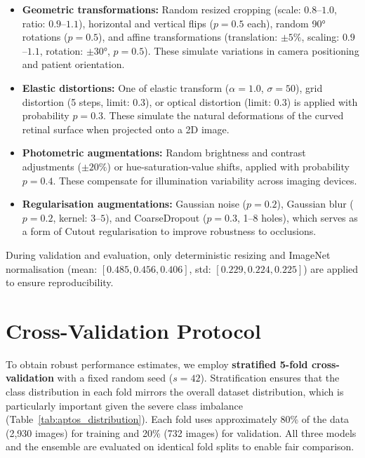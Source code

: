\begin{itemize}
    \item \textbf{Geometric transformations:} Random resized cropping (scale: $0.8$--$1.0$, ratio: $0.9$--$1.1$), horizontal and vertical flips ($p = 0.5$ each), random 90° rotations ($p = 0.5$), and affine transformations (translation: $\pm5\%$, scaling: $0.9$--$1.1$, rotation: $\pm30°$, $p = 0.5$). These simulate variations in camera positioning and patient orientation.
    
    \item \textbf{Elastic distortions:} One of elastic transform ($\alpha = 1.0$, $\sigma = 50$), grid distortion (5 steps, limit: $0.3$), or optical distortion (limit: $0.3$) is applied with probability $p = 0.3$. These simulate the natural deformations of the curved retinal surface when projected onto a 2D image.
    
    \item \textbf{Photometric augmentations:} Random brightness and contrast adjustments ($\pm20\%$) or hue-saturation-value shifts, applied with probability $p = 0.4$. These compensate for illumination variability across imaging devices.
    
    \item \textbf{Regularisation augmentations:} Gaussian noise ($p = 0.2$), Gaussian blur ($p = 0.2$, kernel: $3$--$5$), and CoarseDropout ($p = 0.3$, 1--8 holes), which serves as a form of Cutout regularisation to improve robustness to occlusions.
\end{itemize}

During validation and evaluation, only deterministic resizing and ImageNet normalisation (mean: $[0.485, 0.456, 0.406]$, std: $[0.229, 0.224, 0.225]$) are applied to ensure reproducibility.

\section{Cross-Validation Protocol}
\label{sec:cv}

To obtain robust performance estimates, we employ \textbf{stratified 5-fold cross-validation} \cite{refaeilzadeh2009cross} with a fixed random seed ($s = 42$). Stratification ensures that the class distribution in each fold mirrors the overall dataset distribution, which is particularly important given the severe class imbalance (Table~\ref{tab:aptos_distribution}). Each fold uses approximately 80\% of the data (2,930 images) for training and 20\% (732 images) for validation. All three models and the ensemble are evaluated on identical fold splits to enable fair comparison.
